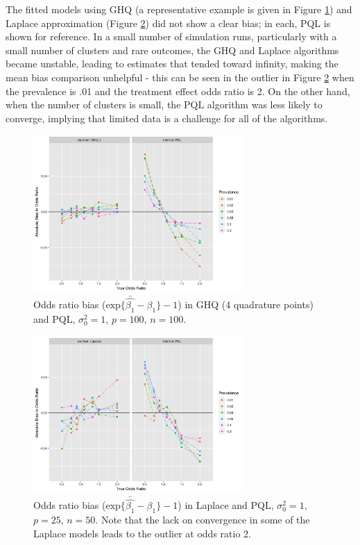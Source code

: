 \documentclass{article}
\begin{document}
\begin{flushleft}
The fitted models using GHQ (a representative example is given in Figure \ref{fig:_bias_pql_ghq4}) and Laplace approximation (Figure \ref{fig:_bias_pql_lap}) did not show a clear bias; in each, PQL is shown for reference. In a small number of simulation runs, particularly with a small number of clusters and rare outcomes, the GHQ and Laplace algorithms became unstable, leading to estimates that tended toward infinity, making the mean bias comparison unhelpful - this can be seen in the outlier in Figure \ref{fig:_bias_pql_lap} when the prevalence is .01 and the treatment effect odds ratio is 2. On the other hand, when the number of clusters is small, the PQL algorithm was less likely to converge, implying that limited data is a challenge for all of the algorithms.

\begin{figure}[]
\begin{center}
\includegraphics[width=8cm]{_bias_pql_ghq4.png}
  \caption{Odds ratio bias ($\text{exp} \{ \bar{\hat{\beta_1}} - \beta_1 \} - 1$) in GHQ (4 quadrature points) and PQL, $\sigma^2_0=1$, $p=100$, $n=100$.}
  \label{fig:_bias_pql_ghq4}
\end{center}
\end{figure}

\begin{figure}[]
\begin{center}
\includegraphics[width=8cm]{_bias_pql_lap.png}
  \caption{Odds ratio bias ($\text{exp} \{ \bar{\hat{\beta_1}} - \beta_1 \} - 1$) in Laplace and PQL, $\sigma^2_0=1$, $p=25$, $n=50$. Note that the lack on convergence in some of the Laplace models leads to the outlier at odds ratio 2.}
  \label{fig:_bias_pql_lap}
\end{center}
\end{figure}




\end{flushleft}
\end{document}

